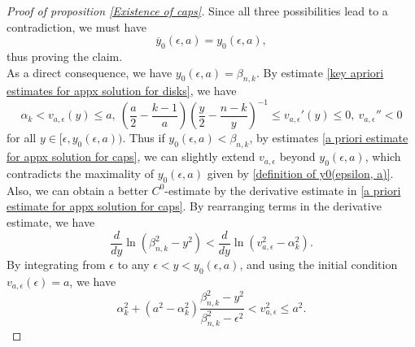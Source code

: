 \documentclass[pdflatex,sn-mathphys-num]{sn-jnl}
\begin{document}
\begin{proof}[Proof of proposition \ref{Existence of caps}]
Since all three possibilities lead to a contradiction, we must have
$$\overline{y}_0(\epsilon, a) = y_0(\epsilon, a),$$
thus proving the claim.\\

As a direct consequence, we have $y_0(\epsilon, a) = \beta_{n,k}$. By estimate \eqref{key apriori estimates for appx solution for disks}, 
we have 
\begin{equation}\label{a priori estimate for appx solution for caps}
    \alpha_k < v_{a, \epsilon}(y) \leq a, \ (\frac{a}{2} - \frac{k-1}{a})(\frac{y}{2} - \frac{n-k}{y})^{-1} \leq v_{a, \epsilon}'(y) \leq 0, \ v_{a, \epsilon}'' < 0
\end{equation}
for all $y \in [\epsilon, y_0(\epsilon, a))$. Thus
if $y_0(\epsilon, a) < \beta_{n,k}$, by estimates \eqref{a priori estimate for appx solution for caps}, we can slightly extend $v_{a, \epsilon}$ beyond $y_0(\epsilon, a)$, which contradicts the maximality of $y_0(\epsilon, a)$ given by \eqref{definition of y0(epsilon, a)}.\\

Also, we can obtain a better $C^0$-estimate by the derivative estimate in \eqref{a priori estimate for appx solution for caps}. By rearranging terms in the derivative estimate, we have 
$$ \frac{d}{dy}\ln(\beta_{n,k}^2 - y^2)< \frac{d}{dy}\ln(v_{a, \epsilon}^2 - \alpha_k^2).$$
By integrating from $\epsilon$ to any $\epsilon < y < y_0(\epsilon, a)$, and using the initial condition $v_{a, \epsilon}(\epsilon) = a$, we have
\begin{equation}\label{better c0 estimate for appx solution for cap}
     \alpha_k^2 + (a^2 - \alpha_k^2)\frac{\beta_{n,k}^2 - y^2}{\beta_{n,k}^2 - \epsilon^2}< v_{a, \epsilon}^2 \leq a^2.
\end{equation}


\end{proof}
\end{document}
